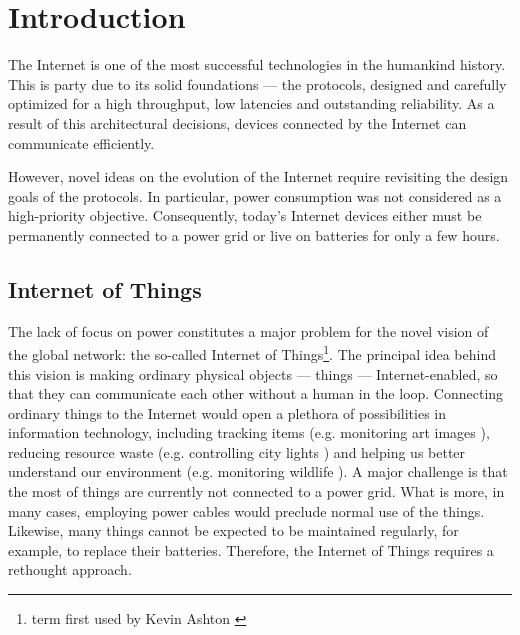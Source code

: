 \chapter{Introduction}

The Internet is one of the most successful technologies in the humankind history.
This is party due to its solid foundations --- the protocols, designed and carefully optimized for a high throughput, low latencies and outstanding reliability.
As a result of this architectural decisions, devices connected by the Internet can communicate efficiently.

However, novel ideas on the evolution of the Internet require revisiting the design goals of the protocols.
In particular, power consumption was not considered as a high-priority objective.
Consequently, today's Internet devices either must be permanently connected to a power grid or live on batteries for only a few hours.

\section{Internet of Things}

The lack of focus on power constitutes a major problem for the novel vision of the global network: the so-called Internet of Things\footnote{term first used by Kevin Ashton \cite{InternetOfThings}}.
The principal idea behind this vision is making ordinary physical objects --- things --- Internet-enabled, so that they can communicate each other without a human in the loop.
Connecting ordinary things to the Internet would open a plethora of possibilities in information technology, including tracking items (e.g. monitoring art images \cite{GuArtNet}), reducing resource waste (e.g. controlling city lights \cite{singhvi2005intelligent}) and helping us better understand our environment (e.g. monitoring wildlife \cite{liu2009long}).
A major challenge is that the most of things are currently not connected to a power grid.
What is more, in many cases, employing power cables would preclude normal use of the things.
Likewise, many things cannot be expected to be maintained regularly, for example, to replace their batteries.
Therefore, the Internet of Things requires a rethought approach.


